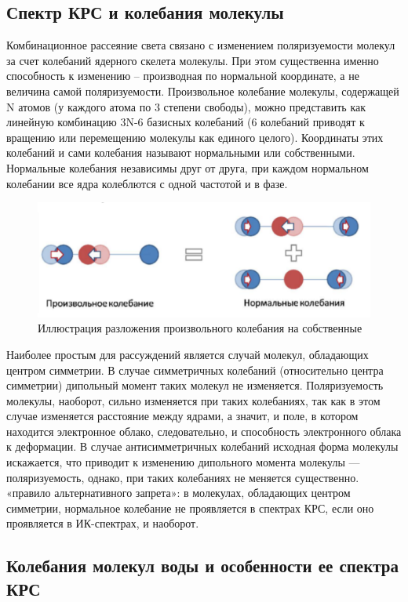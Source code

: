 \documentclass[a4paper,12pt]{article} %
\begin{document}
\subsection{Спектр КРС и колебания молекулы}
Комбинационное рассеяние света связано с изменением поляризуемости
молекул за счет колебаний ядерного скелета молекулы. При этом существенна
именно способность к изменению – производная по нормальной координате, а не величина самой поляризуемости. Произвольное колебание молекулы, содержащей N атомов (у каждого
атома по 3 степени свободы), можно представить как линейную комбинацию
3N-6 базисных колебаний (6 колебаний приводят к вращению или перемещению
молекулы как единого целого). Координаты этих колебаний и сами колебания
называют нормальными или собственными. Нормальные колебания независимы
друг от друга, при каждом нормальном колебании все ядра колеблются с одной
частотой и в фазе.
\begin{figure}[h!]
    \centering
    \includegraphics[scale=0.7]{колебания.png}
    \caption{Иллюстрация разложения произвольного колебания на собственные}
    \label{Ber}
\end{figure}

Наиболее простым для рассуждений является случай молекул, обладающих
центром симметрии. В случае симметричных колебаний (относительно центра
симметрии) дипольный момент таких молекул не изменяется. Поляризуемость
молекулы, наоборот, сильно изменяется при таких колебаниях, так как в этом
случае изменяется расстояние между ядрами, а значит, и поле, в котором
находится электронное облако, следовательно, и способность электронного
облака к деформации. В случае антисимметричных колебаний исходная форма
молекулы искажается, что приводит к изменению дипольного момента
молекулы — поляризуемость, однако, при таких колебаниях не меняется
существенно. «правило альтернативного запрета»: в молекулах, обладающих центром симметрии,
нормальное колебание не проявляется в спектрах КРС, если оно проявляется в
ИК-спектрах, и наоборот.

\subsection{Колебания молекул воды и особенности ее спектра КРС}
\end{document}
